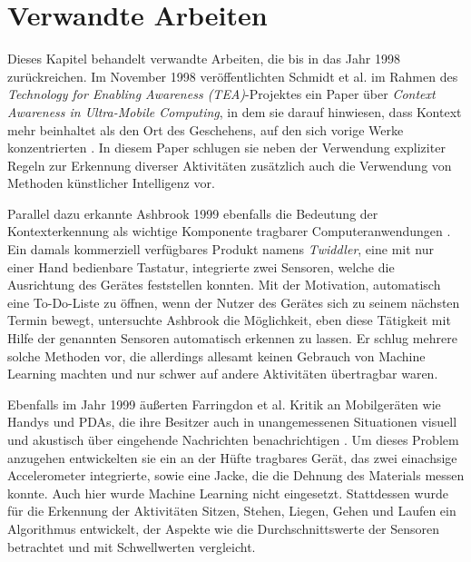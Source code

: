 \chapter{Verwandte Arbeiten}
\label{chap:relatedwork}
Dieses Kapitel behandelt verwandte Arbeiten, die bis in das Jahr 1998 zurückreichen. Im November 1998 veröffentlichten Schmidt et al. im Rahmen des \textit{Technology for Enabling Awareness (TEA)}-Projektes ein Paper über \textit{Context Awareness in Ultra-Mobile Computing}, in dem sie darauf hinwiesen, dass Kontext mehr beinhaltet als den Ort des Geschehens, auf den sich vorige Werke konzentrierten \cite{Schmidt1999}. In diesem Paper schlugen sie neben der Verwendung expliziter Regeln zur Erkennung diverser Aktivitäten zusätzlich auch die Verwendung von Methoden künstlicher Intelligenz vor.

Parallel dazu erkannte Ashbrook 1999 ebenfalls die Bedeutung der Kontexterkennung als wichtige Komponente tragbarer Computeranwendungen \cite{Ashbrook1999}. Ein damals kommerziell verfügbares Produkt namens \textit{Twiddler}, eine mit nur einer Hand bedienbare Tastatur, integrierte zwei Sensoren, welche die Ausrichtung des Gerätes feststellen konnten. Mit der Motivation, automatisch eine To-Do-Liste zu öffnen, wenn der Nutzer des Gerätes sich zu seinem nächsten Termin bewegt, untersuchte Ashbrook die Möglichkeit, eben diese Tätigkeit mit Hilfe der genannten Sensoren automatisch erkennen zu lassen. Er schlug mehrere solche Methoden vor, die allerdings allesamt keinen Gebrauch von Machine Learning machten und nur schwer auf andere Aktivitäten übertragbar waren.

Ebenfalls im Jahr 1999 äußerten Farringdon et al. Kritik an Mobilgeräten wie Handys und PDAs, die ihre Besitzer auch in unangemessenen Situationen visuell und akustisch über eingehende Nachrichten benachrichtigen \cite{Farringdon1999}. Um dieses Problem anzugehen entwickelten sie ein an der Hüfte tragbares Gerät, das zwei einachsige Accelerometer integrierte, sowie eine Jacke, die die Dehnung des Materials messen konnte. Auch hier wurde Machine Learning nicht eingesetzt. Stattdessen wurde für die Erkennung der Aktivitäten Sitzen, Stehen, Liegen, Gehen und Laufen ein Algorithmus entwickelt, der Aspekte wie die Durchschnittswerte der Sensoren betrachtet und mit Schwellwerten vergleicht.

